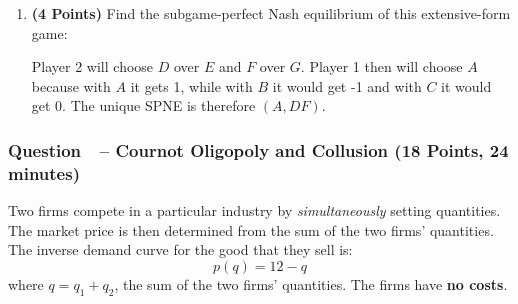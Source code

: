 \documentclass[11pt]{article}
\newcounter{question}[section]
\newcommand{\question}[1]{\refstepcounter{question}
  \subsubsection*{Question~\thequestion~-- #1}}
\newenvironment{subquestions}{
  \begin{enumerate}[label=(\roman*)]}{\end{enumerate}}
\begin{document}
\begin{subquestions}
    \textcolor{solution-color}{
      There are no pure strategy equilibria in this game. Suppose player 1 plays $U$ with probability $p$ and player 2 plays $L$ with probability $q$. Then for player 1:
      \[
        3q - \left( 1-q \right)=-3q+5\left( 1-q \right)\;\;\;\Longrightarrow\;\;\;
        6q=6\left( 1-q \right)\;\;\;\Longrightarrow\;\;\;
        q=1-q\;\;\;\Longrightarrow\;\;\;
        q=\frac{1}{2}
      \]
      For player 2:
      \[
        -3p+ 4\left( 1-p \right)=2p-6\left( 1-p \right)\;\;\;\Longrightarrow\;\;\;
        10\left( 1-p \right)=5p\;\;\;\Longrightarrow\;\;\;
        10-10p=5p\;\;\;\Longrightarrow\;\;\;
        10=15p\;\;\;\Longrightarrow\;\;\;
        p=\frac{2}{3}
      \]
      The unique Nash equilibrium is a mixed strategy equilibrium where
      Player 1 plays $U$ with probability $p=\frac{2}{3}$ and Player 2 plays
      $L$ with probability $q=\frac{1}{2}$.
    }
  \item \textbf{(4 Points)} Find the subgame-perfect Nash equilibrium of this extensive-form game:
    \begin{center}
    \end{center}

    \textcolor{solution-color}{
      Player 2 will choose $D$ over $E$ and $F$ over $G$.
      Player 1 then will choose $A$ because with $A$ it gets 1, while with $B$
      it would get -1 and with $C$ it would get 0. The unique SPNE is therefore $\left( A,DF \right)$.
    }
\end{subquestions}
\question{Cournot Oligopoly and Collusion (18 Points, 24 minutes)}
Two firms compete in a particular industry by \emph{simultaneously} setting quantities. The market price is then determined from the sum of the two firms' quantities. The inverse demand curve for the good that they sell is:
\[
  p\left( q \right)=12-q
\]
where $q=q_1+q_2$, the sum of the two firms' quantities. The firms have \textbf{no costs}.
\end{document}
